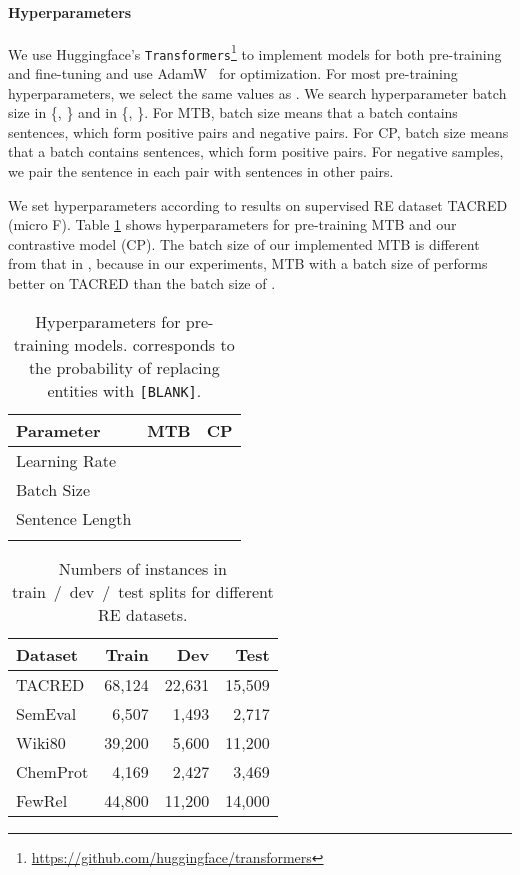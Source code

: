 \documentclass[11pt,a4paper]{article}
\begin{document}
\paragraph{Hyperparameters} We use Huggingface's \texttt{Transformers}\footnote{\url{https://github.com/huggingface/transformers}} to implement models for both pre-training and fine-tuning and use AdamW~\citep{loshchilov2018fixing} for optimization. 
For most pre-training hyperparameters, we select the same values as \citet{soares2019matching}. We search hyperparameter batch size in \{, \} and  in \{, \}. For MTB, batch size  means that a batch contains  sentences, which form  positive pairs and  negative pairs. For CP, batch size  means that a batch contains  sentences, which form  positive pairs.
For negative samples, we pair the sentence in each pair with sentences in other pairs. 


We set hyperparameters according to results on supervised RE dataset TACRED (micro F).
Table \ref{tab:params} shows hyperparameters for pre-training MTB and our contrastive model (CP). The batch size of our implemented MTB is different from that in \citet{soares2019matching}, because in our experiments, MTB with a batch size of  performs better on TACRED than the batch size of . 


\begin{table}[]
\small
    \centering
    \begin{tabular}{l|cc}
        \toprule
        \textbf{Parameter} &  \textbf{MTB} & \textbf{CP} \\
        \midrule 
        Learning Rate &  & \\
        Batch Size &  &  \\
        Sentence Length &  &  \\
         &  &  \\
        \bottomrule
    \end{tabular}
    \caption{Hyperparameters for pre-training models.  corresponds to the probability of replacing entities with \texttt{[BLANK]}.}
    \label{tab:params}
\end{table}

\begin{table}[t]
\small
    \centering
    \begin{tabular}{l|rrr}
        \toprule
        \textbf{Dataset} &  \textbf{Train} & \textbf{Dev} & \textbf{Test} \\
        \midrule 
        TACRED & 68,124 & 22,631 & 15,509 \\
        SemEval & 6,507 & 1,493 & 2,717 \\
        Wiki80 & 39,200 & 5,600& 11,200   \\
        ChemProt & 4,169 & 2,427& 3,469 \\
        FewRel &44,800 & 11,200& 14,000\\ 
        \bottomrule
    \end{tabular}
    \caption{Numbers of instances in train~/~dev~/~test splits for different RE datasets.}
    \label{tab:data_size}
\end{table}
\end{document}
